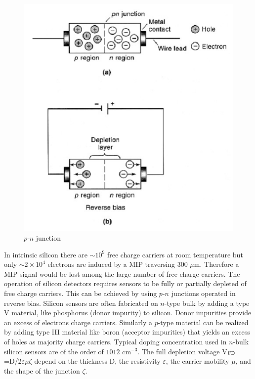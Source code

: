 \bigbreak

\begin{figure}[h]
  \centering
  \includegraphics[scale=.25]{img/depletion.png}
  \caption{$p$-$n$ junction}
  \label{chain}
\end{figure}

\bigbreak

In intrinsic silicon there are $\sim 10^9$ free charge carriers at room
temperature but only $\sim 2 \times 10^4$ electrons are induced by a MIP
traversing 300 $\mu$m. Therefore a MIP signal would be lost among the large
number of free charge carriers. The operation of silicon detectors requires
sensors to be fully or partially depleted of free charge carriers. This can
be achieved by using $p$-$n$ junctions operated in reverse bias. Silicon sensors
are often fabricated on $n$-type bulk by adding a type V material, like
phosphorus  (donor impurity) to silicon. Donor impurities provide an
excess of electrons charge carriers. Similarly a $p$-type material can be
realized by adding type III material like boron  (acceptor impurities)
that yields an excess of holes as majority charge carriers. Typical doping
concentration used in $n$-bulk silicon sensors are of the order of
$1012$ cm$^{-3}$. The full depletion voltage V$_{\textup{FD}}$=D/2$\varepsilon
\mu \zeta$ depend on the thickness D, the resistivity $\varepsilon$, the
carrier mobility $\mu$, and the shape of the junction $\zeta$.

